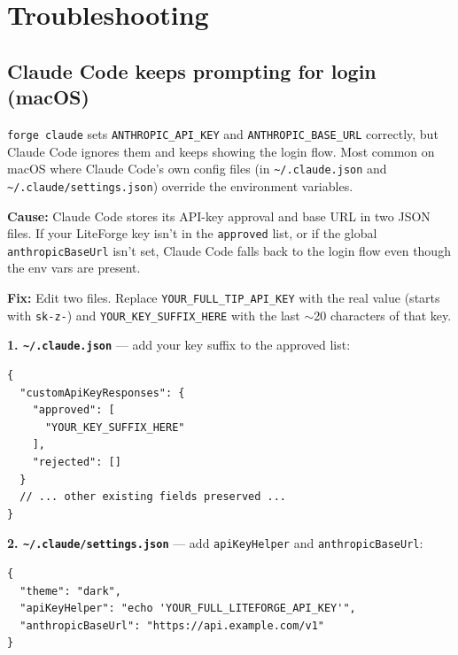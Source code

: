 \documentclass[11pt,letterpaper]{article}
\begin{document}
\section{Troubleshooting}

\subsection{Claude Code keeps prompting for login (macOS)}

\begin{tcolorbox}[warnbox={Symptom}]
\texttt{forge claude} sets \texttt{ANTHROPIC\_API\_KEY} and
\texttt{ANTHROPIC\_BASE\_URL} correctly, but Claude Code ignores them and
keeps showing the login flow. Most common on macOS where Claude Code's
own config files (in \texttt{\textasciitilde/.claude.json} and
\texttt{\textasciitilde/.claude/settings.json}) override the environment
variables.
\end{tcolorbox}

\textbf{Cause:} Claude Code stores its API-key approval and base URL in
two JSON files. If your LiteForge key isn't in the \texttt{approved} list, or
if the global \texttt{anthropicBaseUrl} isn't set, Claude Code falls back
to the login flow even though the env vars are present.

\textbf{Fix:} Edit two files. Replace
\texttt{YOUR\_FULL\_TIP\_API\_KEY} with the real value (starts with
\texttt{sk-z-}) and \texttt{YOUR\_KEY\_SUFFIX\_HERE} with the last
$\sim$20 characters of that key.

\textbf{1. \texttt{\textasciitilde/.claude.json}} --- add your key
suffix to the approved list:

\begin{lstlisting}[style=bash]
{
  "customApiKeyResponses": {
    "approved": [
      "YOUR_KEY_SUFFIX_HERE"
    ],
    "rejected": []
  }
  // ... other existing fields preserved ...
}
\end{lstlisting}

\textbf{2. \texttt{\textasciitilde/.claude/settings.json}} --- add
\texttt{apiKeyHelper} and \texttt{anthropicBaseUrl}:

\begin{lstlisting}[style=bash]
{
  "theme": "dark",
  "apiKeyHelper": "echo 'YOUR_FULL_LITEFORGE_API_KEY'",
  "anthropicBaseUrl": "https://api.example.com/v1"
}
\end{lstlisting}
\end{document}

